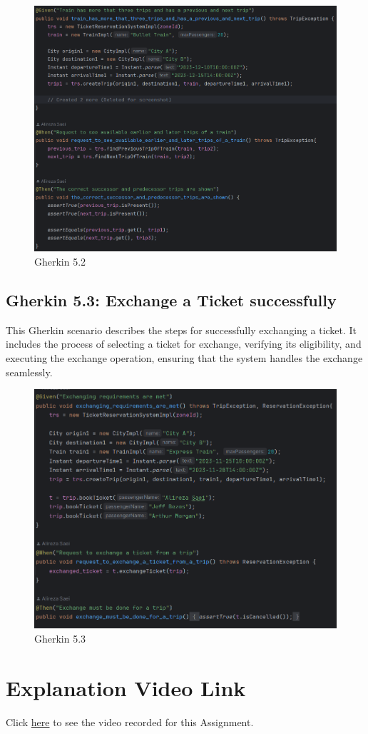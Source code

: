 \documentclass{article}
\begin{document}
\begin{figure}[h]
  \centering
  \includegraphics[width=1.0\textwidth]{pictures/T5-2.png}
  \caption{Gherkin 5.2}
  \label{fig:your_label}
\end{figure}

\pagebreak

\subsection{Gherkin 5.3: Exchange a Ticket successfully}

This Gherkin scenario describes the steps for successfully exchanging a ticket. It includes the process of selecting a ticket for exchange, verifying its eligibility, and executing the exchange operation, ensuring that the system handles the exchange seamlessly.
 
 \begin{figure}[h]
  \centering
  \includegraphics[width=1.0\textwidth]{pictures/T5-3.png}
  \caption{Gherkin 5.3}
  \label{fig:your_label}
\end{figure}
 
\pagebreak

\section{Explanation Video Link}

Click \href{https://www.example.com}{here} to see the video recorded for this Assignment.
\end{document}
